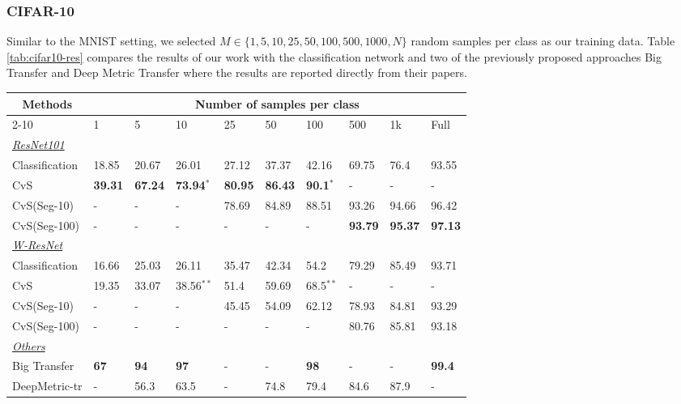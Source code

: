 \documentclass[conference]{IEEEtran}
\begin{document}
\subsubsection{CIFAR-10}\label{sec:cifar10exp}
Similar to the MNIST setting, we selected $M \in \{1, 5, 10, 25, 50, 100, 500, 1000, N\}$ random samples per class as our training data. Table \ref{tab:cifar10-res} compares the results of our work with the classification network and two of the previously proposed approaches Big Transfer \cite{kolesnikov2019big} and Deep Metric Transfer \cite{liu2019deep} where the results are reported directly from their papers. 
%
\begin{table*}[htb]
\small
\centering
\caption{Classification accuracy on CIFAR-10 test set given different numbers of samples per class and methodology.}
\label{tab:cifar10-res}
\begin{tabular}{llllllllll}
\hline
\multicolumn{1}{c}{\multirow{2}{*}{Methods}} & \multicolumn{9}{c}{Number of samples per class} \\ \cline{2-10} 
\multicolumn{1}{c}{} & 1 & 5 & 10 & 25 & 50 & 100 & 500 & 1k & Full \\ \hline
{\ul \textit{ResNet101}} &  &  &  &  &  &  &  &  &  \\
Classification & 18.85 & 20.67 & 26.01 & 27.12 & 37.37 & 42.16 & 69.75 & 76.4 & 93.55 \\
CvS & \textbf{39.31} & \textbf{67.24} & \textbf{73.94$^*$} & \textbf{80.95} & \textbf{86.43} & \textbf{90.1$^*$} & - & - & - \\
CvS(Seg-10) & - & - & - & 78.69 & 84.89 & 88.51 & 93.26 & 94.66 & 96.42 \\
CvS(Seg-100) & - & - & - & - & - & - & \textbf{93.79} & \textbf{95.37} & \textbf{97.13} \\ \hline
{\ul \textit{W-ResNet}} &  &  &  &  &  &  &  &  &  \\
Classification & 16.66 & 25.03 & 26.11 & 35.47 & 42.34 & 54.2 & 79.29 & 85.49 & 93.71 \\
CvS & 19.35 & 33.07 & 38.56$^{**}$ & 51.4 & 59.69 & 68.5$^{**}$ & - & - & - \\
CvS(Seg-10) & - & - & - & 45.45 & 54.09 & 62.12 & 78.93 & 84.81 & 93.29 \\
CvS(Seg-100) & - & - & - & - & - & - & 80.76 & 85.81 & 93.18 \\ \hline
{\ul \textit{Others}} &  &  &  &  &  &  &  &  &  \\
Big Transfer & \textbf{67} & \textbf{94} & \textbf{97} & - & - & \textbf{98} & - & - & \textbf{99.4} \\
DeepMetric-tr & - & 56.3 & 63.5 & - & 74.8 & 79.4 & 84.6 & 87.9 & - \\ \hline
\end{tabular}
\end{table*}
%
\end{document}
